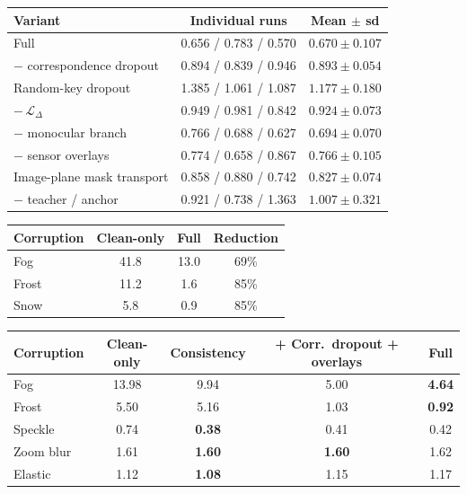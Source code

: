 \begin{tabular}{lcc}
\toprule
Variant & Individual runs & Mean $\pm$ sd \\
\midrule
Full & 0.656 / 0.783 / 0.570 & $0.670\pm0.107$ \\
$-$ correspondence dropout & 0.894 / 0.839 / 0.946 & $0.893\pm0.054$ \\
Random-key dropout & 1.385 / 1.061 / 1.087 & $1.177\pm0.180$ \\
$-\,\mathcal{L}_\Delta$ & 0.949 / 0.981 / 0.842 & $0.924\pm0.073$ \\
$-$ monocular branch & 0.766 / 0.688 / 0.627 & $0.694\pm0.070$ \\
$-$ sensor overlays & 0.774 / 0.658 / 0.867 & $0.766\pm0.105$ \\
Image-plane mask transport & 0.858 / 0.880 / 0.742 & $0.827\pm0.074$ \\
$-$ teacher / anchor & 0.921 / 0.738 / 1.363 & $1.007\pm0.321$ \\
\bottomrule
\end{tabular}

\begin{tabular}{lccc}
\toprule
Corruption & Clean-only & Full & Reduction \\
\midrule
Fog & 41.8 & 13.0 & 69\% \\
Frost & 11.2 & 1.6 & 85\% \\
Snow & 5.8 & 0.9 & 85\% \\
\bottomrule
\end{tabular}

\begin{tabular}{lcccc}
\toprule
Corruption & Clean-only & Consistency & + Corr.\ dropout + overlays & Full \\
\midrule
Fog & 13.98 & 9.94 & 5.00 & \textbf{4.64} \\
Frost & 5.50 & 5.16 & 1.03 & \textbf{0.92} \\
Speckle & 0.74 & \textbf{0.38} & 0.41 & 0.42 \\
Zoom blur & 1.61 & \textbf{1.60} & \textbf{1.60} & 1.62 \\
Elastic & 1.12 & \textbf{1.08} & 1.15 & 1.17 \\
\bottomrule
\end{tabular}

